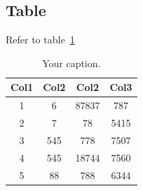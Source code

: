 \documentclass{article}
\begin{document}
\subsection{Table}

Refer to table~\ref{tab:demo-table}

\begin{table}[ht!]
    \begin{center}
        \begin{tabular}{||c c c c||} 
        \hline
        Col1 & Col2 & Col2 & Col3 \\ [0.5ex] 
        \hline\hline
        1 & 6 & 87837 & 787 \\ 
        \hline
        2 & 7 & 78 & 5415 \\
        \hline
        3 & 545 & 778 & 7507 \\
        \hline
        4 & 545 & 18744 & 7560 \\
        \hline
        5 & 88 & 788 & 6344 \\ [1ex] 
        \hline
        \end{tabular}
    \caption{\label{tab:demo-table}Your caption.}
    \end{center}
\end{table}
\end{document}
